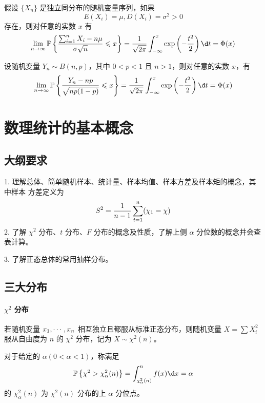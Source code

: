 \begin{theorem}[列维 - 林德伯格定理]
	假设 $\{X_n\}$ 是独立同分布的随机变量序列，如果
	\[ E(X_i) = \mu, D(X_i) = \sigma^2 > 0 \]
	存在，则对任意的实数 $x$ 有
	\[ \lim_{n \to \infty} \bbP\left\{ \frac{\sum_{i=1}^n X_i - n \mu}{\sigma \sqrt{n}} \leqslant x \right\} = \frac{1}{\sqrt{2 \pi}} \int_{-\infty}^x \exp\left(-\frac{t^2}{2}\right) \d t = \Phi(x)  \]
\end{theorem}

\begin{theorem}
	设随机变量 $Y_n \sim B(n, p)$，其中 $0 < p < 1$ 且 $n > 1$，则对任意的实数 $x$，有
	\[ \lim_{n \to \infty} \bbP\left\{ \frac{Y_n - np}{\sqrt{np(1 - p)}} \leqslant x \right\} = \frac{1}{\sqrt{2 \pi}} \int_{-\infty}^x \exp\left(-\frac{t^2}{2}\right) \d t = \Phi(x)  \]
\end{theorem}


\section{数理统计的基本概念}

\subsection{大纲要求}

1. 理解总体、简单随机样本、统计量、样本均值、样本方差及样本矩的概念，其中样本
方差定义为
\[ S^2 = \frac{1}{n-1} \sum_{t=1}^n (\chi_1 = \chi) \cal \]
2. 了解 $\chi^2$ 分布、$t$ 分布、$F$ 分布的概念及性质，了解上侧 $\alpha$ 分位数的概念并会查表计算。

3. 了解正态总体的常用抽样分布。

\subsection{三大分布}

\paragraph{$\chi^2$ 分布}

若随机变量 $x_1,\cdots,x_n$ 相互独立且都服从标准正态分布，则随机变量 $X = \sum X_i^2$ 服从自由度为 $n$ 的 $\chi^2$ 分布，记为 $X \sim \chi^2(n)$。

对于给定的 $\alpha(0 < \alpha < 1)$，称满足
\[ \bbP\left\{\chi^2 > \chi_\alpha^2(n)\right\} = \int_{\chi_\alpha^2(n)}^n f(x) \d x = \alpha  \]
的 $\chi_\alpha^2(n)$ 为 $\chi^2(n)$ 分布的上 $\alpha$ 分位点。

